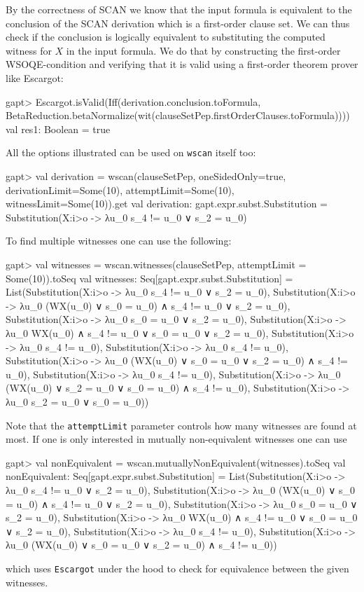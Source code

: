 \documentclass[a4paper,11pt]{book}
\begin{document}
By the correctness of SCAN we know that the input formula is equivalent to the conclusion of the SCAN derivation which is a first-order clause set.
We can thus check if the conclusion is logically equivalent to substituting the computed witness for $X$ in the input formula. We do that by constructing the first-order WSOQE-condition and verifying that it is valid using a first-order theorem prover like Escargot:
\begin{clilisting}
  gapt> Escargot.isValid(Iff(derivation.conclusion.toFormula, BetaReduction.betaNormalize(wit(clauseSetPep.firstOrderClauses.toFormula))))
  val res1: Boolean = true

\end{clilisting}

All the options illustrated can be used on \texttt{wscan} itself too:
\begin{clilisting}
  gapt> val derivation = wscan(clauseSetPep, oneSidedOnly=true, derivationLimit=Some(10), attemptLimit=Some(10), witnessLimit=Some(10)).get
  val derivation: gapt.expr.subst.Substitution = Substitution(X:i>o -> λu_0 s_4 != u_0 ∨ s_2 = u_0)

\end{clilisting}

To find multiple witnesses one can use the following:
\begin{clilisting}
  gapt> val witnesses = wscan.witnesses(clauseSetPep, attemptLimit = Some(10)).toSeq
  val witnesses: Seq[gapt.expr.subst.Substitution] = List(Substitution(X:i>o -> λu_0 s_4 != u_0 ∨ s_2 = u_0), Substitution(X:i>o -> λu_0 (WX(u_0) ∨ s_0 = u_0) ∧ s_4 != u_0 ∨ s_2 = u_0), Substitution(X:i>o -> λu_0 s_0 = u_0 ∨ s_2 = u_0), Substitution(X:i>o -> λu_0 WX(u_0) ∧ s_4 != u_0 ∨ s_0 = u_0 ∨ s_2 = u_0), Substitution(X:i>o -> λu_0 s_4 != u_0), Substitution(X:i>o -> λu_0 s_4 != u_0), Substitution(X:i>o -> λu_0 (WX(u_0) ∨ s_0 = u_0 ∨ s_2 = u_0) ∧ s_4 != u_0), Substitution(X:i>o -> λu_0 s_4 != u_0), Substitution(X:i>o -> λu_0 (WX(u_0) ∨ s_2 = u_0 ∨ s_0 = u_0) ∧ s_4 != u_0), Substitution(X:i>o -> λu_0 s_2 = u_0 ∨ s_0 = u_0))

\end{clilisting}

Note that the \texttt{attemptLimit} parameter controls how many witnesses are found at most.
If one is only interested in mutually non-equivalent witnesses one can use
\begin{clilisting}
  gapt> val nonEquivalent = wscan.mutuallyNonEquivalent(witnesses).toSeq
  val nonEquivalent: Seq[gapt.expr.subst.Substitution] = List(Substitution(X:i>o -> λu_0 s_4 != u_0 ∨ s_2 = u_0), Substitution(X:i>o -> λu_0 (WX(u_0) ∨ s_0 = u_0) ∧ s_4 != u_0 ∨ s_2 = u_0), Substitution(X:i>o -> λu_0 s_0 = u_0 ∨ s_2 = u_0), Substitution(X:i>o -> λu_0 WX(u_0) ∧ s_4 != u_0 ∨ s_0 = u_0 ∨ s_2 = u_0), Substitution(X:i>o -> λu_0 s_4 != u_0), Substitution(X:i>o -> λu_0 (WX(u_0) ∨ s_0 = u_0 ∨ s_2 = u_0) ∧ s_4 != u_0))

\end{clilisting}
which uses \texttt{Escargot} under the hood to check for equivalence between the given witnesses.
\end{document}
